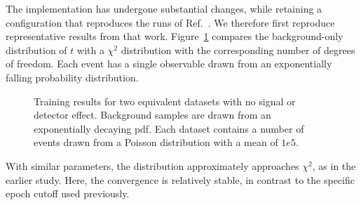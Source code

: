 \documentclass[paper/ddppaper2.tex]{subfiles}
\begin{document}
\label{sec:reproduction}

The implementation has undergone substantial changes, while retaining a configuration that reproduces the runs of Ref.~\cite{LastDDPPaper}. We therefore first reproduce representative results from that work. Figure~\ref{fig:t_distribution_plot_reproduction} compares the background-only distribution of $t$ with a $\chi^2$ distribution with the corresponding number of degrees of freedom. Each event has a single observable drawn from an exponentially falling probability distribution.

\begin{figure}
    \caption{Training results for two equivalent datasets with no signal or detector effect. Background samples are drawn from an exponentially decaying \gls{pdf}. Each dataset contains a number of events drawn from a Poisson distribution with a mean of $1e5$.}
    \label{fig:t_distribution_plot_reproduction}
\end{figure}

With similar parameters, the distribution approximately approaches $\chi^2$, as in the earlier study. Here, the convergence is relatively stable, in contrast to the specific epoch cutoff used previously.
\end{document}

